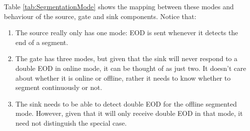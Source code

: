 Table \ref{tab:SegmentationMode} shows the mapping between these modes
and behaviour of the source, gate and sink components.  Notice that:
\begin{enumerate}
\item The source really only has one mode: EOD is sent whenever it
  detects the end of a segment.
\item The gate has three modes, but given that the sink will never
  respond to a double EOD in online mode, it can be thought of as just
  two.  It doesn't care about whether it is online or offline, rather
  it needs to know whether to segment continuously or not.
\item The sink needs to be able to detect double EOD for the offline
  segmented mode.  However, given that it will only receive double EOD
  in that mode, it need not distinguish the special case.
\end{enumerate}


